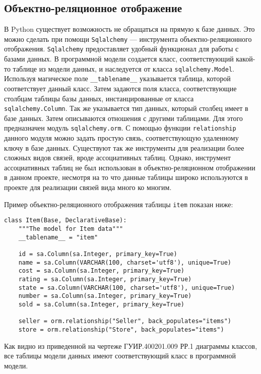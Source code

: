 \subsection{Объектно-реляционное отображение}
В Python существует возможность не обращаться на прямую к базе данных. Это можно сделать при помощи \texttt{Sqlalchemy} --- инструмента объектно-реляционного отображения. \texttt{Sqlalchemy} предоставляет удобный функционал для работы с базами данных. В программной модели создается класс, соответствующий какой-то таблице из модели данных, и наследуется от класса \texttt{sqlalchemy.Model}. Используя магическое поле \texttt{\_\_tablename\_\_} указывается таблица, которой соответствует данный класс. Затем задаются поля класса, соответствующие столбцам таблицы базы данных, инстанцированные от класса \texttt{sqlalchemy.Column}. Так же указывается тип данных, который столбец имеет в базе данных. Затем описываются отношения с другими таблицами. Для этого предназначен модуль \texttt{sqlalchemy.orm}. С помощью функции \texttt{relationship} данного модуля можно задать простую связь, соответствующую удаленному ключу в базе данных. Существуют так же инструменты для реализации более сложных видов связей, вроде ассоциативных таблиц. Однако, инструмент ассоциативных таблиц не был использован в объектно-реляционном отображении в данном проекте, несмотря на то что данные таблицы широко используются в проекте для реализации связей вида много ко многим.

Пример объектно-реляционного отображения таблицы \texttt{item} показан ниже:

\medskip
\begin{lstlisting}[style=Python]
class Item(Base, DeclarativeBase):
    """The model for Item data"""
    __tablename__ = "item"

    id = sa.Column(sa.Integer, primary_key=True)
    name = sa.Column(VARCHAR(100, charset='utf8'), unique=True)
    cost = sa.Column(sa.Integer, primary_key=True)
    rating = sa.Column(sa.Integer, primary_key=True)
    state = sa.Column(VARCHAR(100, charset='utf8'), unique=True)
    number = sa.Column(sa.Integer, primary_key=True)
    sold = sa.Column(sa.Integer, primary_key=True)

    seller = orm.relationship("Seller", back_populates="items")
    store = orm.relationship("Store", back_populates="items")
\end{lstlisting}
\medskip

Как видно из приведенной на чертеже ГУИР.400201.009 РР.1 диаграммы классов, все таблицы модели данных имеют соответствующий класс в программной модели.

